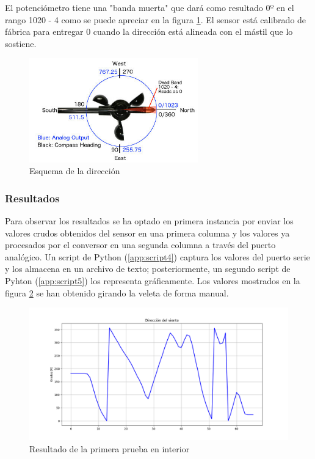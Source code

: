 \documentclass[a4paper, 11pt]{article}
\begin{document}
El potenciómetro tiene una "banda muerta" que dará como resultado 0º en el rango 1020 - 4 como se puede apreciar en la figura \ref{fig:direction}. El sensor está calibrado de fábrica para entregar 0 cuando la dirección está alineada con el mástil que lo sostiene.

\begin{figure}[h]
	\center
	\includegraphics[width=0.65\textwidth]{img/direction.jpg}
	\caption{Esquema de la dirección}
	\label{fig:direction}
\end{figure}

\subsubsection{Resultados}
Para observar los resultados se ha optado en primera instancia por enviar los valores crudos obtenidos del sensor en una primera columna y los valores ya procesados por el conversor en una segunda columna a través del puerto analógico. Un script de Python (\ref{app:script4}) captura los valores del puerto serie y los almacena en un archivo de texto; posteriormente, un segundo script de Pyhton (\ref{app:script5}) los representa gráficamente. Los valores mostrados en la figura \ref{fig:testdirection1} se han obtenido girando la veleta de forma manual.

\begin{figure}[h]
	\center
	\includegraphics[width=1\textwidth]{img/testDirectionIn.png}
	\caption{Resultado de la primera prueba en interior}
	\label{fig:testdirection1}
\end{figure}
\end{document}
